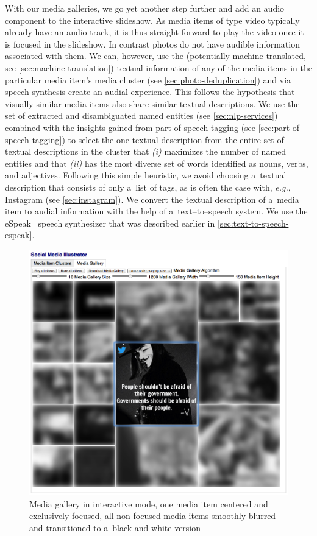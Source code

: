 With our media galleries, we go yet another step further
and add an audio component to the interactive slideshow.
As media items of type video typically already have an audio track,
it is thus straight-forward to play the video once it is focused
in the slideshow.
In contrast photos do not have audible information associated with them.
We can, however, use the (potentially machine-translated,
see \autoref{sec:machine-translation}) textual information
of any of the media items in the particular media item's media cluster
(see \autoref{sec:photo-deduplication})
and via speech synthesis create an audial experience.
This follows the hypothesis that visually similar media items 
also share similar textual descriptions.
We use the set of extracted and disambiguated named entities
(see \autoref{sec:nlp-services}) combined with
the insights gained from part-of-speech tagging
(see \autoref{sec:part-of-speech-tagging})
to select the one textual description
from the entire set of textual descriptions in the cluster
that \textit{(i)} maximizes the number of named entities
and that \textit{(ii)} has the most diverse set of words
identified as nouns, verbs, and adjectives.
Following this simple heuristic, we avoid choosing
a~textual description that consists of only a~list of tags,
as is often the case with, \emph{e.g.},
Instagram (see \autoref{sec:instagram}).
We convert the textual description of a~media item
to audial information with the help of a~text--to--speech system.
We use the eSpeak~\cite{duddington2012espeak} speech synthesizer
that was described earlier in \autoref{sec:text-to-speech-espeak}.

\begin{figure}[!ht]
  \centering
  \includegraphics[width=1\columnwidth]{occupygezi1.png}
  \caption[Media gallery in interactive mode]{Media gallery in interactive mode, one media item centered and exclusively focused, all non-focused media items smoothly blurred and transitioned to a~black-and-white version}
  \label{fig:occupygezi1}
\end{figure}

